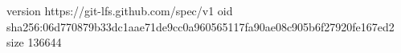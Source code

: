version https://git-lfs.github.com/spec/v1
oid sha256:06d770879b33dc1aae71de9cc0a960565117fa90ae08c905b6f27920fe167ed2
size 136644
